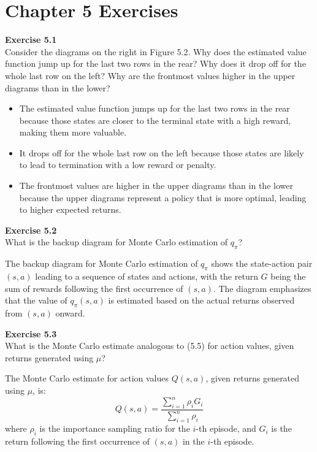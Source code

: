 \documentclass[addpoints]{exam}
\begin{document}
\section*{Chapter 5 Exercises}

\begin{questions}
    \question
    \textbf{Exercise 5.1} \\ Consider the diagrams on the right in Figure 5.2. Why does the estimated value function jump up for the last two rows in the rear? Why does it drop off for the whole last row on the left? Why are the frontmost values higher in the upper diagrams than in the lower?
    \begin{solution}
        \begin{itemize}
            \item The estimated value function jumps up for the last two rows in the rear because those states are closer to the terminal state with a high reward, making them more valuable.
            \item It drops off for the whole last row on the left because those states are likely to lead to termination with a low reward or penalty.
            \item The frontmost values are higher in the upper diagrams than in the lower because the upper diagrams represent a policy that is more optimal, leading to higher expected returns.
        \end{itemize}
    \end{solution}

    \question
    \textbf{Exercise 5.2} \\ What is the backup diagram for Monte Carlo estimation of \( q_{\pi} \)?
    \begin{solution}
        The backup diagram for Monte Carlo estimation of \( q_{\pi} \) shows the state-action pair \( (s, a) \) leading to a sequence of states and actions, with the return \( G \) being the sum of rewards following the first occurrence of \( (s, a) \). The diagram emphasizes that the value of \( q_{\pi}(s, a) \) is estimated based on the actual returns observed from \( (s, a) \) onward.
    \end{solution}

    \question
    \textbf{Exercise 5.3} \\ What is the Monte Carlo estimate analogous to (5.5) for action values, given returns generated using \( \mu \)?
    \begin{solution}
        The Monte Carlo estimate for action values \( Q(s, a) \), given returns generated using \( \mu \), is:
        \[
        Q(s, a) = \frac{\sum_{i=1}^{n} \rho_i G_i}{\sum_{i=1}^{n} \rho_i}
        \]
        where \( \rho_i \) is the importance sampling ratio for the \( i \)-th episode, and \( G_i \) is the return following the first occurrence of \( (s, a) \) in the \( i \)-th episode.
    \end{solution}


\end{questions}
\end{document}
